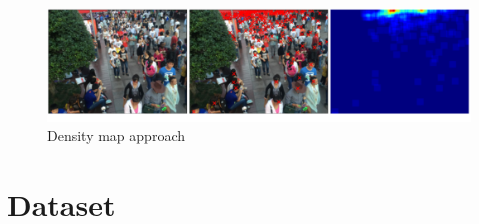 \documentclass[10pt,twocolumn,letterpaper]{article}
\begin{document}
\begin{figure}[h!]
  \includegraphics[width=\linewidth]{pics/densitymapapproach.png}
  \caption{Density map approach}
  \label{fig:densitymap}
\end{figure}



\section{Dataset}






{\small


}
\end{document}
